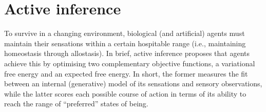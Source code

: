 \documentclass[review,12pt,authoryear]{elsarticle}
\begin{document}
\section{Active inference}
\label{sec: active inference}

To survive in a changing environment, biological (and artificial) agents must maintain their sensations within a certain hospitable range (i.e., maintaining homeostasis through allostasis). In brief, active inference proposes that agents achieve this by optimising two complementary objective functions, a variational free energy and an expected free energy. In short, the former measures the fit between an internal (generative) model of its sensations and sensory observations, while the latter scores each possible course of action in terms of its ability to reach the range of “preferred” states of being.
\end{document}
